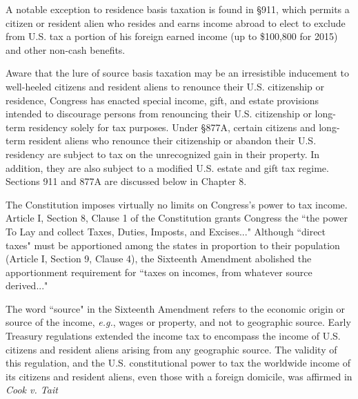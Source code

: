 A notable exception to residence basis taxation is found in  \S 911, which permits a citizen or resident alien who resides and earns income abroad to elect to exclude from U.S. tax a portion of his foreign earned income (up to \$100,800 for 2015) and other non-cash benefits.  

Aware that the lure of source basis taxation may be an irresistible inducement to well-heeled citizens and resident aliens to renounce their U.S. citizenship or residence, Congress has enacted special income, gift, and estate provisions intended to discourage persons from renouncing their U.S. citizenship or long-term residency solely for tax purposes.  Under \S 877A, certain citizens and long-term resident aliens who renounce their citizenship or abandon their U.S. residency are subject to tax on the unrecognized gain in their property.  In addition, they are also subject to a modified U.S. estate and gift tax regime.  Sections 911 and 877A are discussed below in Chapter 8.   

The Constitution imposes virtually no limits on Congress's power to tax income.  Article I, Section 8, Clause 1 of the Constitution grants Congress the ``the power To Lay and collect Taxes, Duties, Imposts, and Excises..."  Although ``direct taxes" must be apportioned among the states in proportion to their population (Article I, Section 9, Clause 4), the Sixteenth Amendment abolished the apportionment requirement for ``taxes on incomes, from whatever source derived..."

The word ``source" in the Sixteenth Amendment refers to the economic origin or source of the income, \textit{e.g.}, wages or property, and not to geographic source.  Early Treasury regulations extended the income tax to encompass the income of U.S. citizens and resident aliens arising from any geographic source.  The validity of this regulation, and the U.S. constitutional power to tax the worldwide income of its citizens and resident aliens, even those with a foreign domicile, was affirmed in \textit{Cook v. Tait} 

